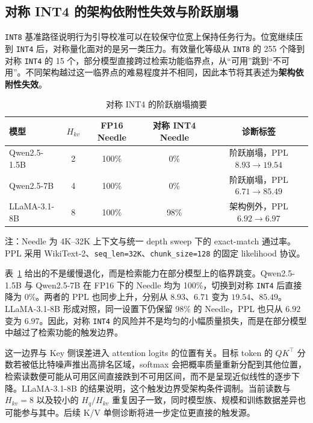 \subsection{对称 INT4 的架构依附性失效与阶跃崩塌}
\label{subsec:ch4-int4-cliff}

\texttt{INT8} 基准路径说明行为引导校准可以在较保守位宽上保持任务行为。位宽继续压到 \texttt{INT4} 后，对称量化面对的是另一类压力。有效量化等级从 \texttt{INT8} 的 255 个降到对称 \texttt{INT4} 的 15 个，部分模型直接跨过检索功能临界点，从“可用”跳到“不可用”。不同架构越过这一临界点的难易程度并不相同，因此本节将其表述为\textbf{架构依附性失效}。

\begin{table}[H]
  \centering
  \caption{对称 INT4 的阶跃崩塌摘要}
  \label{tab:ch4-int4-cliff}
  {%
  \footnotesize
  \setlength{\tabcolsep}{4pt}
  \renewcommand{\arraystretch}{1.05}
  \begin{tabular}{lcccc}
    \toprule
    模型 & $H_{kv}$ & FP16 Needle & 对称 INT4 Needle & 诊断标签 \\
    \midrule
    Qwen2.5-1.5B & 2 & 100\% & 0\%  & 阶跃崩塌，PPL $8.93 \rightarrow 19.54$ \\
    Qwen2.5-7B   & 4 & 100\% & 0\%  & 阶跃崩塌，PPL $6.71 \rightarrow 85.49$ \\
    LLaMA-3.1-8B & 8 & 100\% & 98\% & 架构例外，PPL $6.92 \rightarrow 6.97$ \\
    \bottomrule
  \end{tabular}

  \vspace{0.35em}
  \begin{minipage}{0.94\linewidth}
    \footnotesize
    注：Needle 为 4K--32K 上下文与统一 depth sweep 下的 exact-match 通过率。PPL 采用 WikiText-2、\texttt{seq\_len=32K}、\texttt{chunk\_size=128} 的固定 likelihood 协议。
  \end{minipage}
  }
\end{table}

表~\ref{tab:ch4-int4-cliff} 给出的不是缓慢退化，而是检索能力在部分模型上的临界跳变。Qwen2.5-1.5B 与 Qwen2.5-7B 在 FP16 下的 Needle 均为 100\%，切换到对称 \texttt{INT4} 后直接降为 0\%。两者的 PPL 也同步上升，分别从 $8.93$、$6.71$ 变为 $19.54$、$85.49$。LLaMA-3.1-8B 形成对照，同一设置下仍保留 98\% 的 Needle，PPL 也只从 $6.92$ 变为 $6.97$。因此，对称 \texttt{INT4} 的风险并不是均匀的小幅质量损失，而是在部分模型中越过了检索功能的触发边界。

这一边界与 Key 侧误差进入 attention logits 的位置有关。目标 token 的 $QK^\top$ 分数若被低比特噪声推出高排名区域，softmax 会把概率质量重新分配到其他位置，检索读数便可能从可用区间直接跌到不可用区间，而不是呈现近似线性的逐步下降。LLaMA-3.1-8B 的结果说明，这个触发边界受架构条件调制。当前读数与 $H_{kv}=8$ 以及较小的 $H_q/H_{kv}$ 重复因子一致，同时模型族、规模和训练数据差异也可能参与其中。后续 K/V 单侧诊断将进一步定位更直接的触发源。

